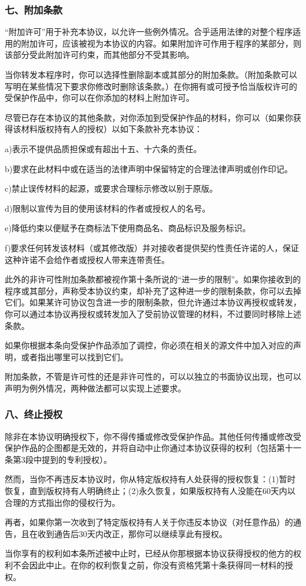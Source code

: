 \subsubsection{七、附加条款}
“附加许可”用于补充本协议，以允许一些例外情况。合乎适用法律的对整个程序适用的附加许可，应该被视为本协议的内容。如果附加许可作用于程序的某部分，则该部分受此附加许可约束，而其他部分不受其影响。\par
当你转发本程序时，你可以选择性删除副本或其部分的附加条款。（附加条款可以写明在某些情况下要求你修改时删除该条款。）在你拥有或可授予恰当版权许可的受保护作品中，你可以在你添加的材料上附加许可。\par
尽管已存在本协议的其他条款，对你添加到受保护作品的材料，你可以（如果你获得该材料版权持有人的授权）以如下条款补充本协议：\par
a)表示不提供品质担保或有超出十五、十六条的责任。\par
b)要求在此材料中或在适当的法律声明中保留特定的合理法律声明或创作印记。\par
c)禁止误传材料的起源，或要求合理标示修改以别于原版。\par
d)限制以宣传为目的使用该材料的作者或授权人的名号。\par
e)降低约束以便赋予在商标法下使用商品名、商品标识及服务标识。\par
f)要求任何转发该材料（或其修改版）并对接收者提供契约性责任许诺的人，保证这种许诺不会给作者或授权人带来连带责任。\par
此外的非许可性附加条款都被视作第十条所说的“进一步的限制”。如果你接收到的程序或其部分，声称受本协议约束，却补充了这种进一步的限制条款，你可以去掉它们。如果某许可协议包含进一步的限制条款，但允许通过本协议再授权或转发，你可以通过本协议再授权或转发加入了受前协议管理的材料，不过要同时移除上述条款。\par
如果你根据本条向受保护作品添加了调控，你必须在相关的源文件中加入对应的声明，或者指出哪里可以找到它们。\par
附加条款，不管是许可性的还是非许可性的，可以以独立的书面协议出现，也可以声明为例外情况，两种做法都可以实现上述要求。
\subsubsection{八、终止授权}
除非在本协议明确授权下，你不得传播或修改受保护作品。其他任何传播或修改受保护作品的企图都是无效的，并将自动中止你通过本协议获得的权利（包括第十一条第3段中提到的专利授权）。\par
然而，当你不再违反本协议时，你从特定版权持有人处获得的授权恢复：(1)暂时恢复，直到版权持有人明确终止；(2)永久恢复，如果版权持有人没能在60天内以合理的方式指出你的侵权行为。\par
再者，如果你第一次收到了特定版权持有人关于你违反本协议（对任意作品）的通告，且在收到通告后30天内改正，那你可以继续享此有授权。\par
当你享有的权利如本条所述被中止时，已经从你那根据本协议获得授权的他方的权利不会因此中止。在你的权利恢复之前，你没有资格凭第十条获得同一材料的授权。\par
